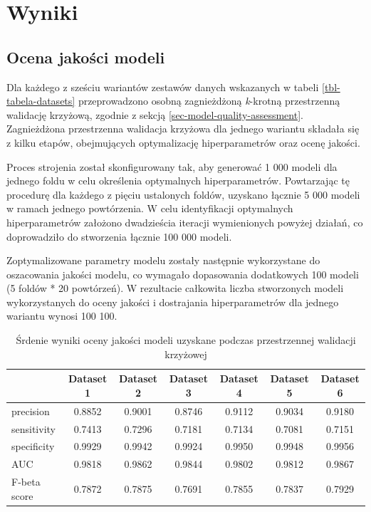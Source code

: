 \documentclass{amuthesis}
\begin{document}
\hypertarget{sec-wyniki}{%
\chapter{Wyniki}\label{sec-wyniki}}

\hypertarget{sec-results-model-quality-assessment}{%
\section{Ocena jakości
modeli}\label{sec-results-model-quality-assessment}}

Dla każdego z sześciu wariantów zestawów danych wskazanych w tabeli
\ref{tbl-tabela-datasets} przeprowadzono osobną zagnieżdżoną
\emph{k}-krotną przestrzenną walidację krzyżową, zgodnie z sekcją
\ref{sec-model-quality-assessment}. Zagnieżdżona przestrzenna walidacja
krzyżowa dla jednego wariantu składała się z kilku etapów, obejmujących
optymalizację hiperparametrów oraz ocenę jakości.

Proces strojenia został skonfigurowany tak, aby generować 1 000 modeli
dla jednego foldu w celu określenia optymalnych hiperparametrów.
Powtarzając tę procedurę dla każdego z pięciu ustalonych foldów,
uzyskano łącznie 5 000 modeli w ramach jednego powtórzenia. W celu
identyfikacji optymalnych hiperparametrów założono dwadzieścia iteracji
wymienionych powyżej działań, co doprowadziło do stworzenia łącznie 100
000 modeli.

Zoptymalizowane parametry modelu zostały następnie wykorzystane do
oszacowania jakości modelu, co wymagało dopasowania dodatkowych 100
modeli (5 foldów * 20 powtórzeń). W rezultacie całkowita liczba
stworzonych modeli wykorzystanych do oceny jakości i dostrajania
hiperparametrów dla jednego wariantu wynosi 100 100.

\hypertarget{tbl-tabela-performance-measures}{}
\begin{table}
\caption{\label{tbl-tabela-performance-measures}Śrdenie wyniki oceny jakości modeli uzyskane podczas przestrzennej
walidacji krzyżowej }\tabularnewline

\centering
\begin{tabular}{lcccccc}
\toprule
  & Dataset 1 & Dataset 2 & Dataset 3 & Dataset 4 & Dataset 5 & Dataset 6\\
\midrule
precision & 0.8852 & 0.9001 & 0.8746 & 0.9112 & 0.9034 & 0.9180\\
sensitivity & 0.7413 & 0.7296 & 0.7181 & 0.7134 & 0.7081 & 0.7151\\
specificity & 0.9929 & 0.9942 & 0.9924 & 0.9950 & 0.9948 & 0.9956\\
AUC & 0.9818 & 0.9862 & 0.9844 & 0.9802 & 0.9812 & 0.9867\\
F-beta score & 0.7872 & 0.7875 & 0.7691 & 0.7855 & 0.7837 & 0.7929\\
\bottomrule
\end{tabular}
\end{table}
\end{document}
